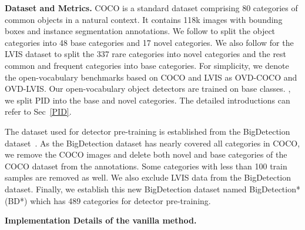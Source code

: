 \documentclass[sigconf]{acmart}
\begin{document}
\textbf{Dataset and Metrics.} 
COCO is a standard dataset comprising 80 categories of common objects in a natural context. It contains 118k images with bounding boxes and instance segmentation annotations. We follow  to split the object categories into 48 base categories and 17 novel categories. We also follow  for the LVIS dataset to split the 337 rare categories into novel categories and the rest common and frequent categories into base categories. For simplicity, we denote the open-vocabulary benchmarks based on COCO and LVIS as OVD-COCO and OVD-LVIS. 
Our open-vocabulary object detectors are trained on base classes. , we split PID into the base and novel categories. The detailed introductions can refer to Sec~\ref{PID}.

The dataset used for detector pre-training is established from the BigDetection dataset~\cite{bigdetection}. As the BigDetection dataset has nearly covered all categories in COCO, we remove the COCO images and delete both novel and base categories of the COCO dataset from the annotations. Some categories with less than 100 train samples are removed as well. We also exclude LVIS data from the BigDetection dataset. Finally, we establish this new BigDetection dataset named BigDetection* (BD*) which has 489 categories for detector pre-training.

\textbf{Implementation Details of the vanilla method.}
\end{document}
